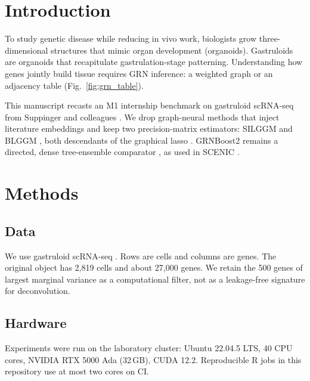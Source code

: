 \documentclass[sn-nature]{sn-jnl}
\begin{document}

\maketitle

\section{Introduction}
\label{sec1}

To study genetic disease while reducing in vivo work, biologists grow
three-dimensional structures that mimic organ development (organoids).
Gastruloids are organoids that recapitulate gastrulation-stage
patterning. Understanding how genes jointly build tissue requires GRN
inference: a weighted graph or an adjacency table
(Fig.~\ref{fig:grn_table}).

This manuscript recasts an M1 internship benchmark
on gastruloid scRNA-seq from Suppinger and colleagues
\cite{suppingerMultimodalCharacterizationMurine2023}. We drop graph-neural
methods that inject literature embeddings and keep two precision-matrix
estimators: SILGGM \cite{zhangSILGGMExtensivePackage2018} and BLGGM
\cite{wuEstimatingHeterogeneousGene2022}, both descendants of the
graphical lasso \cite{friedmanSparseInverseCovariance2008}.
GRNBoost2 remains a directed, dense tree-ensemble comparator
\cite{moermanGRNBoost2ArboretoEfficient2019}, as used in SCENIC
\cite{aibarScenicSinglecellRegulatory2017}.

\section{Methods}
\label{sec2}

\subsection{Data}
We use gastruloid scRNA-seq \cite{suppingerMultimodalCharacterizationMurine2023}.
Rows are cells and columns are genes. The original object has 2{,}819
cells and about 27{,}000 genes. We retain the 500 genes of largest
marginal variance as a computational filter, not as a leakage-free
signature for deconvolution.

\subsection{Hardware}
Experiments were run on the laboratory cluster: Ubuntu 22.04.5 LTS, 40
CPU cores, NVIDIA RTX 5000 Ada (32\,GB), CUDA 12.2. Reproducible R
jobs in this repository use at most two cores on CI.
\end{document}
